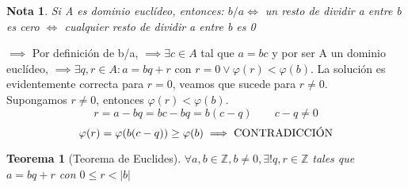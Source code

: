 \documentclass[11pt, a4paper, titlepage]{article}
\makeatletter
\renewenvironment{proof}[1][\proofname] {\vspace{-15pt}\par\pushQED{\qed}\normalfont\topsep6\p@\@plus6\p@\relax\trivlist\item[\hskip\labelsep\it#1\@addpunct{.}]\ignorespaces}{\popQED\endtrivlist\@endpefalse}
\providecommand{\ent}{\mathbb{Z}}
\theoremstyle{theorem-style}
\newtheorem*{nth}{Teorema}
\theoremstyle{definition-style}
\theoremstyle{remark-style}
\newtheorem*{nota}{Nota}
\theoremstyle{example-style}
\makeatother
\begin{document}
\begin{nota}
	Si A es dominio euclídeo, entonces: 
$b/a \iff$ un resto de dividir a entre b es cero $\iff$ cualquier resto de dividir a entre b es 0 
\end{nota}
\begin{proof}
	$\boxed{\implies}$ Por definición de b/a, $\implies \exists c \in A$ tal que $a=bc$ y por ser A un dominio euclídeo, $\implies \exists q,r \in 		A : 	a = bq + r $ con $r=0 \vee \varphi(r) < \varphi(b)$. La solución 	es evidentemente correcta para $r = 0$, veamos que sucede para $r \neq 	0$.
\\
Supongamos $r \neq 0$, entonces $\varphi(r) < \varphi(b)$. 
$$r = a - bq = bc - bq = b(c-q) \quad \quad c-q \neq 0$$
$$\varphi(r) = \varphi(b(c-q)) \ge \varphi(b) \implies \textup{CONTRADICCIÓN}$$  
\end{proof}

\begin{nth}[Teorema de Euclides]

	$\forall a,b \in \ent, b \neq 0, \exists !q,r \in \ent$ tales que $a = bq + r $ con $0 \le r < |b|$
\end{nth}
\end{document}
